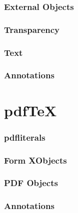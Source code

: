 

\section{External Objects}



\section{Transparency}



\section{Text}



\section{Annotations}



\part{pdf\TeX}



\section{pdfliterals}



\section{Form XObjects}



\section{PDF Objects}



\section{Annotations}



\bye


